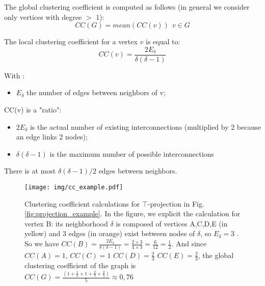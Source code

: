 \documentclass[table]{report}
\begin{document}
\noindent
The global clustering coefficient is computed as follows (in general we consider only vertices  with degree $>$ 1):
$$CC(G) = mean(CC(v)) \ \  v \in G $$ 

\noindent
The local clustering coefficient for a vertex $v$ is equal to:
$$CC(v) = \dfrac{2 E_{\delta}}{\delta (\delta -1) }$$

\noindent
With : 

\begin{itemize}[noitemsep]
    \item $E_{\delta}$ the number of edges between neighbors of v;
\end{itemize}


\noindent
CC(v) is a "ratio":

\begin{itemize}[noitemsep]
    \item $2 E_{\delta}$ is the actual number of existing interconnections (multiplied by 2 because an edge links 2 nodes);
    \item $\delta (\delta -1)$ is the maximum number of possible interconnections
\end{itemize}

\noindent
There is at most $\delta (\delta -1)/2$ edges between neighbors.

\begin{figure}[h]%
\centering
\texttt{[image: img/cc\_example.pdf]}
\caption{Clustering coefficient calculations for $\top$-projection in Fig. \ref{fig:projection_example}. In the figure, we explicit the calculation for vertex B: its neighborhood $\delta$ is composed of vertices A,C,D,E (in yellow) and 3 edges (in orange) exist between nodes of $\delta$, so $E_{\delta} = 3$ . So we have
$CC(B) = \frac{2 E_{\delta}}{\delta (\delta -1)} = \frac{2 \times 3}{4 \times 3} =  \frac{6}{12} = \frac{1}{2}$. And since 
$CC(A)=1$, 
$CC(C)=1$
$CC(D)=\frac{2}{3}$
$CC(E)=\frac{2}{3}$, the global clustering  coefficient of the graph is $CC(G)= \frac{(1+\frac{1}{2}+1+\frac{2}{3}+\frac{2}{3})}{5} \approx 0,76$}

\label{fig:cc_example2}
\end{figure}
\FloatBarrier





\end{document}
